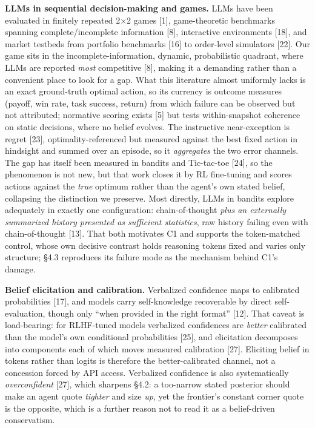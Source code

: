 \documentclass[
  10pt,
]{article}
\begin{document}
\textbf{LLMs in sequential decision-making and games.} LLMs have been evaluated in finitely repeated 2×2 games {[}1{]}, game-theoretic benchmarks spanning complete/incomplete information {[}8{]}, interactive environments {[}18{]}, and market testbeds from portfolio benchmarks {[}16{]} to order-level simulators {[}22{]}. Our game sits in the incomplete-information, dynamic, probabilistic quadrant, where LLMs are reported \emph{most} competitive {[}8{]}, making it a demanding rather than a convenient place to look for a gap. What this literature almost uniformly lacks is an exact ground-truth optimal action, so its currency is outcome measures (payoff, win rate, task success, return) from which failure can be observed but not attributed; normative scoring exists {[}5{]} but tests within-snapshot coherence on static decisions, where no belief evolves. The instructive near-exception is regret {[}23{]}, optimality-referenced but measured against the best fixed action in hindsight and summed over an episode, so it \emph{aggregates} the two error channels. The gap has itself been measured in bandits and Tic-tac-toe {[}24{]}, so the phenomenon is not new, but that work closes it by RL fine-tuning and scores actions against the \emph{true} optimum rather than the agent's own stated belief, collapsing the distinction we preserve. Most directly, LLMs in bandits explore adequately in exactly one configuration: chain-of-thought \emph{plus an externally summarized history presented as sufficient statistics}, raw history failing even with chain-of-thought {[}13{]}. That both motivates C1 and supports the token-matched control, whose own decisive contrast holds reasoning tokens fixed and varies only structure; §4.3 reproduces its failure mode as the mechanism behind C1's damage.

\textbf{Belief elicitation and calibration.} Verbalized confidence maps to calibrated probabilities {[}17{]}, and models carry self-knowledge recoverable by direct self-evaluation, though only ``when provided in the right format'' {[}12{]}. That caveat is load-bearing: for RLHF-tuned models verbalized confidences are \emph{better} calibrated than the model's own conditional probabilities {[}25{]}, and elicitation decomposes into components each of which moves measured calibration {[}27{]}. Eliciting belief in tokens rather than logits is therefore the better-calibrated channel, not a concession forced by API access. Verbalized confidence is also systematically \emph{overconfident} {[}27{]}, which sharpens §4.2: a too-narrow stated posterior should make an agent quote \emph{tighter} and size \emph{up}, yet the frontier's constant corner quote is the opposite, which is a further reason not to read it as a belief-driven conservatism.
\end{document}
